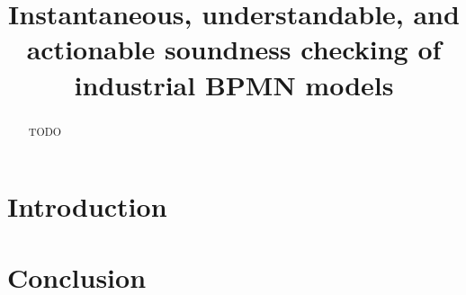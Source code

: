 \documentclass[runningheads]{llncs}
\begin{document}
%
\title{Instantaneous, understandable, and actionable soundness checking of industrial BPMN models}
%
%
%
\maketitle              %
%
\begin{abstract}
TODO
\end{abstract}

\section{Introduction}

\cite{krauterFormalizationAnalysisBPMN2023}


\section{Conclusion}

 

\end{document}
